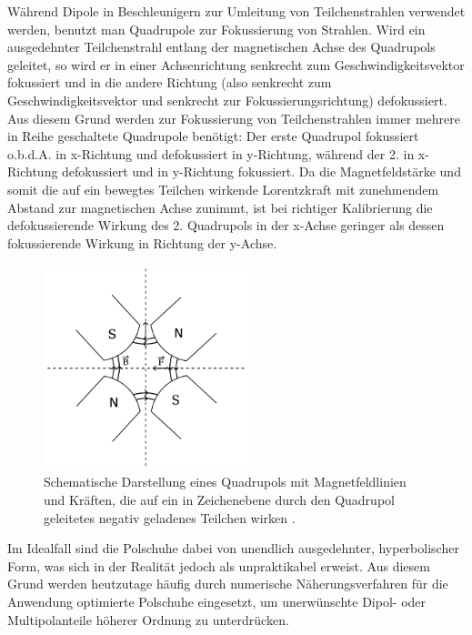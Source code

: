 \documentclass[bigchapter,colorback,accentcolor=tud4b,linedtoc,11pt]{tudreport}
\begin{document}
Während Dipole in Beschleunigern zur Umleitung von Teilchenstrahlen verwendet werden, benutzt man Quadrupole zur Fokussierung von Strahlen. Wird ein ausgedehnter Teilchenstrahl entlang der  magnetischen Achse des Quadrupols geleitet, so wird er in einer Achsenrichtung senkrecht zum Geschwindigkeitsvektor fokussiert und in die andere Richtung (also senkrecht zum Geschwindigkeitsvektor und senkrecht zur Fokussierungsrichtung) defokussiert. Aus diesem Grund werden zur Fokussierung von Teilchenstrahlen immer mehrere in Reihe geschaltete Quadrupole benötigt: Der erste Quadrupol fokussiert o.b.d.A. in x-Richtung und defokussiert in y-Richtung, während der 2. in x-Richtung defokussiert und in y-Richtung fokussiert. Da die Magnetfeldstärke und somit die auf ein bewegtes Teilchen wirkende Lorentzkraft mit zunehmendem Abstand zur magnetischen Achse zunimmt, ist bei richtiger Kalibrierung die defokussierende Wirkung des 2. Quadrupols in der x-Achse geringer als dessen fokussierende Wirkung in Richtung der y-Achse.

\begin{figure}[H]
\centering
\includegraphics[width=60mm]{img/quadrupol.png}
\caption{Schematische Darstellung eines Quadrupols mit Magnetfeldlinien und Kräften, die auf ein in Zeichenebene durch den Quadrupol geleitetes negativ geladenes Teilchen wirken \cite{anleitung}.}
\end{figure}

Im Idealfall sind die Polschuhe dabei von unendlich ausgedehnter, hyperbolischer Form, was sich in der Realität jedoch als unpraktikabel erweist. Aus diesem Grund werden heutzutage häufig durch numerische Näherungsverfahren für die Anwendung optimierte Polschuhe eingesetzt, um unerwünschte Dipol- oder Multipolanteile höherer Ordnung zu unterdrücken. 
\end{document}
